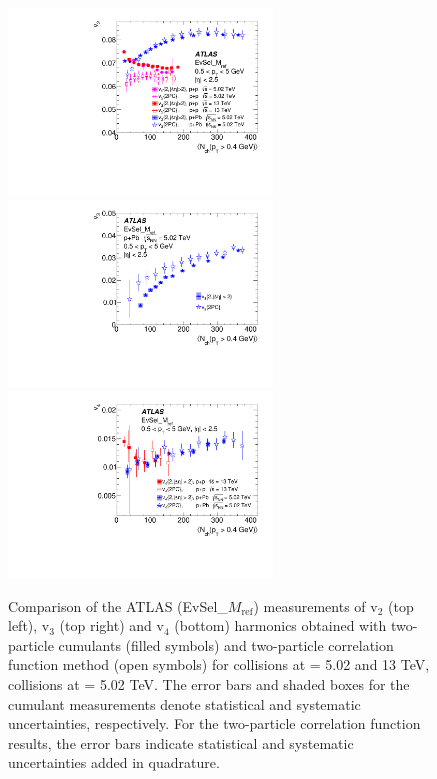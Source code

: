 \documentclass[cernpreprint,texlive=2014,txfonts,UKenglish]{latex/atlasdoc}
\begin{document}
\begin{figure}[ht!]
\begin{center}
\includegraphics[width=70mm]{fig_17a.pdf}
\includegraphics[width=70mm]{fig_17b.pdf}
\includegraphics[width=70mm]{fig_17c.pdf}
\caption{Comparison of  the ATLAS  (EvSel\_$M_{\mathrm{ref}}$) measurements of $\mathrm{v}_2$ (top left), $\mathrm{v}_3$ (top right) and $\mathrm{v}_4$ (bottom) harmonics obtained with two-particle cumulants (filled symbols) and two-particle correlation function method (open symbols) for \pp collisions at \sqs= 5.02 and 13 TeV, \pPb collisions at \sqn= 5.02 TeV. The error bars and shaded boxes for the cumulant measurements denote statistical and systematic uncertainties, respectively. For the two-particle correlation function results, the error bars indicate statistical and systematic uncertainties added in quadrature. }
\label{fig:comp_2pc} 
\end{center}
\end{figure}
\end{document}
